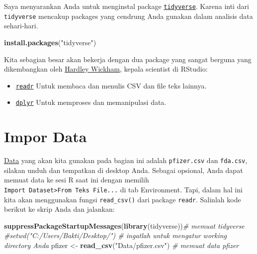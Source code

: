 \documentclass[
]{book}
\newenvironment{Shaded}{\begin{snugshade}}{\end{snugshade}}
\newcommand{\CommentTok}[1]{\textcolor[rgb]{0.56,0.35,0.01}{\textit{#1}}}
\newcommand{\FunctionTok}[1]{\textcolor[rgb]{0.13,0.29,0.53}{\textbf{#1}}}
\newcommand{\NormalTok}[1]{#1}
\newcommand{\OtherTok}[1]{\textcolor[rgb]{0.56,0.35,0.01}{#1}}
\newcommand{\StringTok}[1]{\textcolor[rgb]{0.31,0.60,0.02}{#1}}
\providecommand{\tightlist}{%
  \setlength{\itemsep}{0pt}\setlength{\parskip}{0pt}}
\begin{document}
Saya menyarankan Anda untuk menginstal package \href{https://www.tidyverse.org/packages/}{\texttt{tidyverse}}. Karena inti dari \texttt{tidyverse} mencakup packages yang cendrung Anda gunakan dalam analisis data sehari-hari.

\begin{Shaded}
\begin{Highlighting}[]
\FunctionTok{install.packages}\NormalTok{(}\StringTok{"tidyverse"}\NormalTok{)}
\end{Highlighting}
\end{Shaded}

Kita sebagian besar akan bekerja dengan dua package yang sangat berguna yang dikembangkan oleh \href{http://hadley.nz/}{Hardley Wickham}, kepala scientist di RStudio:

\begin{itemize}
\tightlist
\item
  \href{https://readr.tidyverse.org/}{\texttt{readr}} Untuk membaca dan menulis CSV dan file teks lainnya.
\item
  \href{https://dplyr.tidyverse.org/}{\texttt{dplyr}} Untuk memproses dan memanipulasi data.
\end{itemize}

\hypertarget{impor-data}{%
\section{Impor Data}\label{impor-data}}

\href{https://raw.githubusercontent.com/dsciencelabs/Algoritma_Pemrograman_R/main/Data/pfizer.csv}{Data} yang akan kita gunakan pada bagian ini adalah \texttt{pfizer.csv} dan \texttt{fda.csv}, silakan unduh dan tempatkan di desktop Anda. Sebagai opsional, Anda dapat memuat data ke sesi R saat ini dengan memilih \texttt{Import\ Dataset\textgreater{}From\ Teks\ File...} di tab Environment. Tapi, dalam hal ini kita akan menggunakan fungsi \texttt{read\_csv()} dari package \texttt{readr}. Salinlah kode berikut ke skrip Anda dan jalankan:

\begin{Shaded}
\begin{Highlighting}[]
\FunctionTok{suppressPackageStartupMessages}\NormalTok{(}\FunctionTok{library}\NormalTok{(tidyverse))}\CommentTok{\# memuat tidyverse}
\CommentTok{\#setwd("C:/Users/Bakti/Desktop/")                 \# ingatlah untuk mengatur working directory Anda}
\NormalTok{pfizer }\OtherTok{\textless{}{-}} \FunctionTok{read\_csv}\NormalTok{(}\StringTok{"Data/pfizer.csv"}\NormalTok{)             }\CommentTok{\# memuat data \textasciigrave{}pfizer\textasciigrave{} }
\end{Highlighting}
\end{Shaded}
\end{document}
